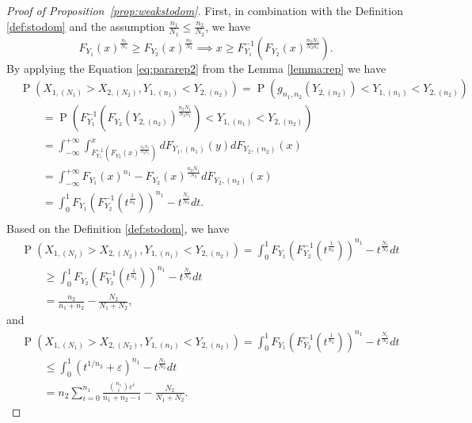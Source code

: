 \documentclass[12pt]{article}
\DeclareMathOperator*{\Prob}{P}
\begin{document}
\begin{proof}[Proof of Proposition~\ref{prop:weakstodom}]
First, in combination with the Definition \ref{def:stodom} and the assumption $\frac{n_1}{N_1} \leq \frac{n_2}{N_2}$, we have 
$$
  F_{Y_1}(x)^{\frac{n_1}{N_1}} \geq F_{Y_2}(x)^{\frac{n_2}{N_2}} 
 \implies  
 x \geq F_{Y_1}^{-1}\left(F_{Y_2}(x)^{\frac{n_2N_1}{N_2n_1}}\right).
$$ 
By applying the Equation \ref{eq:pararep2} from the Lemma \ref{lemma:rep} we have 
\begin{align*}
	&\Prob\left(X_{1,(N_1)} > X_{2,(N_2)}, Y_{1,(n_1)} < Y_{2,(n_2)}\right) 
	= \Prob\left( g_{n_1,n_2}\left(Y_{2,(n_2)}\right) < Y_{1,(n_1)}  < Y_{2,(n_2)}\right) \\
	&\qquad = \Prob\left( F_{Y_1}^{-1}\left(F_{Y_2}(Y_{2,(n_2)})^{\frac{n_2N_1}{N_2n_1}}\right) < Y_{1,(n_1)}  < Y_{2,(n_2)}\right) \\
	&\qquad = \int_{-\infty}^{+\infty} \int_{F_{Y_1}^{-1}\left(F_{Y_2}(x)^{\frac{n_2N_1}{N_2n_1}}\right)}^{x} d F_{Y_1, (n_1)}(y) d F_{Y_2, (n_2)}(x) \\
	&\qquad = \int_{-\infty}^{+\infty} F_{Y_1}(x)^{n_1} - F_{Y_2}(x)^{\frac{n_2N_1}{N_2}}d F_{Y_2, (n_2)}(x)\\
	&\qquad = \int_0^1 F_{Y_1}\left( F_{Y_2}^{-1}(t^{\frac{1}{n_2}}) \right)^{n_1} - t^{\frac{N_1}{N_2}} dt. \\
\end{align*}
Based on the Definition \ref{def:stodom}, we have
\begin{align*}
	&\Prob\left(X_{1,(N_1)} > X_{2,(N_2)}, Y_{1,(n_1)} < Y_{2,(n_2)}\right) 
	= \int_0^1 F_{Y_1}\left( F_{Y_2}^{-1}(t^{\frac{1}{n_2}}) \right)^{n_1} - t^{\frac{N_1}{N_2}} dt \\
	&\qquad \geq \int_0^1 F_{Y_2}\left( F_{Y_2}^{-1}(t^{\frac{1}{n_2}}) \right)^{n_1} - t^{\frac{N_1}{N_2}} dt \\
	&\qquad = \frac{n_2}{n_1+n_2} - \frac{N_2}{N_1+N_2},
\end{align*}
and
\begin{align*}
	&\Prob\left(X_{1,(N_1)} > X_{2,(N_2)}, Y_{1,(n_1)} < Y_{2,(n_2)}\right) 
	= \int_0^1 F_{Y_1}\left( F_{Y_2}^{-1}(t^{\frac{1}{n_2}}) \right)^{n_1} - t^{\frac{N_1}{N_2}} dt \\
	&\qquad \leq \int_0^1 \left(t^{1/n_2} + \varepsilon\right)^{n_1} - t^{\frac{N_1}{N_2}} dt\\
	&\qquad = n_2\sum_{i=0}^{n_1} \frac{{n_1 \choose i}\varepsilon^i}{n_1+n_2-i}- \frac{N_2}{N_1 + N_2}.
\end{align*}
\end{proof}
\end{document}
